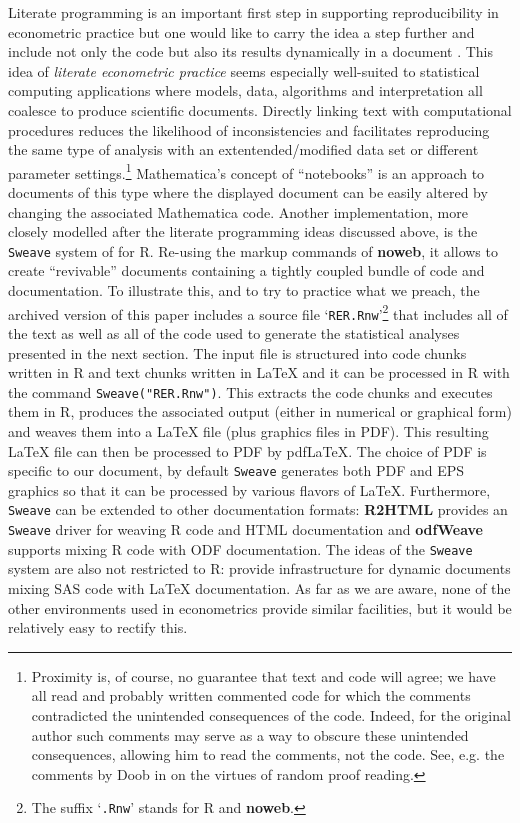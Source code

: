 \documentclass[10pt,a4paper,twoside]{article}
\let\code=\texttt
\let\pkg=\textbf
\let\proglang=\textsf
\newcommand{\file}[1]{`\code{#1}'}
\begin{document}
Literate programming is an important first step in supporting reproducibility in
econometric practice but one would like to carry the idea a step further and include not only
the code but also its results dynamically in a document \citep{repro:Leisch+Rossini:2003}. 
This idea of \emph{literate econometric practice} seems especially well-suited to statistical
computing applications where models, data, algorithms and interpretation all coalesce
to produce scientific documents. Directly linking text with computational procedures
reduces the likelihood of inconsistencies and facilitates reproducing the same type of
analysis with an extentended/modified data set or different parameter
settings.\footnote{Proximity is, of course, no guarantee that text and code will agree; we have all 
read and probably written commented code for which the comments contradicted the 
unintended consequences of the code. Indeed, for the original author
such comments may serve as a way to obscure these unintended consequences,
allowing him to read the comments, not the code.  See, e.g. the comments
by Doob in \citet[pp.~308--309]{repro:Snell:1997} on the virtues of random proof reading.}
\proglang{Mathematica}'s concept of ``notebooks'' is an approach to documents of this type
where the displayed document can be easily altered by changing the associated \proglang{Mathematica}
code. Another implementation, more closely modelled after the literate programming ideas
discussed above, is the \code{Sweave} system of \cite{repro:Leisch:2002} for \proglang{R}.
Re-using the markup commands of \pkg{noweb}, it allows to create ``revivable'' documents
containing a tightly coupled bundle of code and documentation. To illustrate this,
and to try to practice what we preach, the archived version of this paper includes
a source file \file{RER.Rnw}\footnote{The suffix \file{.Rnw} stands for \proglang{R} and
\pkg{noweb}.} that includes all of the text as well as all of the code used to generate
the statistical analyses presented in the next section. The input file is structured
into code chunks written in \proglang{R} and text chunks written in {\LaTeX} and it
can be processed in \proglang{R} with the command \verb|Sweave("RER.Rnw")|.
This extracts the code chunks and executes them in \proglang{R}, produces the associated
output (either in numerical or graphical form) and weaves them into a 
{\LaTeX} file (plus graphics files in PDF). This resulting {\LaTeX} file can
then be processed to PDF by pdf{\LaTeX}. The choice of PDF is specific to our document,
by default \code{Sweave} generates both PDF and EPS graphics so that it can be processed
by various flavors of {\LaTeX}. Furthermore, \code{Sweave} can be extended to other
documentation formats: \pkg{R2HTML} \citep{repro:Lecoutre:2003} provides an \code{Sweave}
driver for weaving \proglang{R} code and \proglang{HTML} documentation and
\pkg{odfWeave} \citep{repro:Kuhn:2006} supports mixing \proglang{R} code with ODF
documentation. The ideas of the \code{Sweave} system are also not restricted to \proglang{R}:
\cite{repro:Lenth+Hojsgaard:2007} provide infrastructure for dynamic documents
mixing \proglang{SAS} code with {\LaTeX} documentation.
As far as we are aware, none of the other environments used in econometrics 
provide similar facilities, but it would be relatively easy to 
rectify this.
\end{document}
